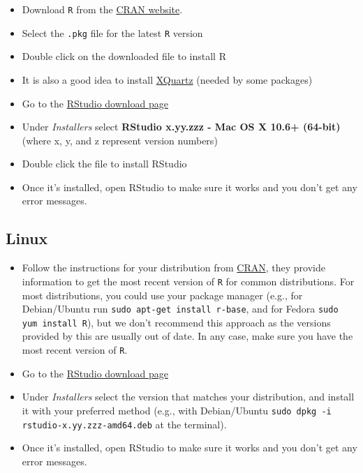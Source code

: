 \documentclass[
  12pt, krantz2,
]{krantz}
\newcommand{\passthrough}[1]{#1}
\providecommand{\tightlist}{%
  \setlength{\itemsep}{0pt}\setlength{\parskip}{0pt}}
\newcommand{\1}{\mathbbm{1}}
\theoremstyle{definition}
\theoremstyle{definition}
\theoremstyle{definition}
\theoremstyle{definition}
\theoremstyle{remark}
\begin{document}
\begin{itemize}
\tightlist
\item
  Download \passthrough{\lstinline!R!} from
  the \href{http://cran.r-project.org/bin/macosx}{CRAN website}.
\item
  Select the \passthrough{\lstinline!.pkg!} file for the latest \passthrough{\lstinline!R!} version
\item
  Double click on the downloaded file to install R
\item
  It is also a good idea to install \href{https://www.xquartz.org/}{XQuartz} (needed
  by some packages)
\item
  Go to the \href{https://www.rstudio.com/products/rstudio/download/\#download}{RStudio download
  page}
\item
  Under \emph{Installers} select \textbf{RStudio x.yy.zzz - Mac OS X 10.6+ (64-bit)}
  (where x, y, and z represent version numbers)
\item
  Double click the file to install RStudio
\item
  Once it's installed, open RStudio to make sure it works and you don't get any
  error messages.
\end{itemize}

\hypertarget{linux}{%
\subsection{Linux}\label{linux}}

\begin{itemize}
\tightlist
\item
  Follow the instructions for your distribution
  from \href{https://cloud.r-project.org/bin/linux}{CRAN}, they provide information
  to get the most recent version of \passthrough{\lstinline!R!} for common distributions. For most
  distributions, you could use your package manager (e.g., for Debian/Ubuntu run
  \passthrough{\lstinline!sudo apt-get install r-base!}, and for Fedora \passthrough{\lstinline!sudo yum install R!}), but we
  don't recommend this approach as the versions provided by this are
  usually out of date. In any case, make sure you have the most recent version
  of \passthrough{\lstinline!R!}.
\item
  Go to the \href{https://www.rstudio.com/products/rstudio/download/\#download}{RStudio download
  page}
\item
  Under \emph{Installers} select the version that matches your distribution, and
  install it with your preferred method (e.g., with Debian/Ubuntu \passthrough{\lstinline!sudo dpkg -i   rstudio-x.yy.zzz-amd64.deb!} at the terminal).
\item
  Once it's installed, open RStudio to make sure it works and you don't get any
  error messages.
\end{itemize}
\end{document}
